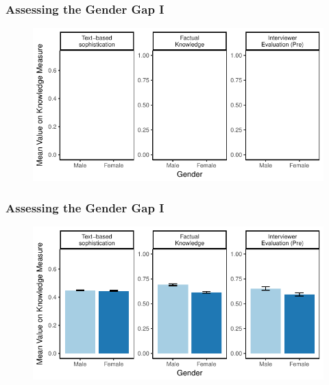 \documentclass{beamer}
\begin{document}
\begin{frame} %
\frametitle{Assessing the Gender Gap I}
  \begin{figure}
  \includegraphics{../fig/meandiff_empty.pdf}
  \end{figure}
\end{frame}
\begin{frame} %
\frametitle{Assessing the Gender Gap I}
  \begin{figure}
  \includegraphics{../fig/meandiff_pres.pdf}
  \end{figure}
\end{frame}
\end{document}
